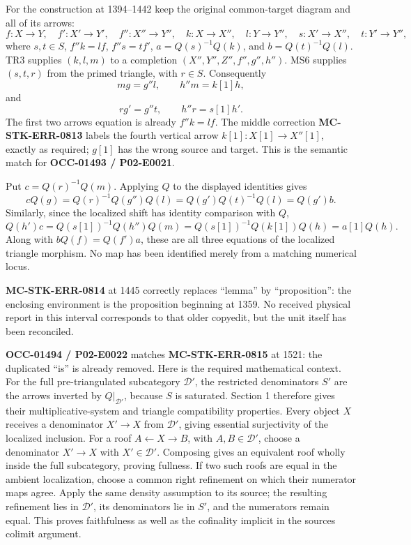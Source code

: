 For the construction at 1394–\allowbreak{}1442 keep the original common-target diagram and all of its arrows:\allowbreak{} \[
f:X\to Y,\quad f':X'\to Y',\quad f'':X''\to Y'',\quad
k:X\to X'',\quad l:Y\to Y'',\quad s:X'\to X'',\quad t:Y'\to Y'',
\] where \(s,t\in S\),\allowbreak{} \(f''k=lf\),\allowbreak{} \(f''s=tf'\),\allowbreak{} \(a=Q(s)^{-1}Q(k)\),\allowbreak{} and \(b=Q(t)^{-1}Q(l)\). TR3 supplies \((k,l,m)\) to a completion \((X'',Y'',Z'',f'',g'',h'')\). MS6 supplies \((s,t,r)\) from the primed triangle,\allowbreak{} with \(r\in S\). Consequently \[
mg=g''l,\qquad h''m=k[1]h,
\] and \[
rg'=g''t,\qquad h''r=s[1]h'.
\] The first two arrows\textquotesingle{} equation is already \(f''k=lf\). The middle correction \textbf{MC-STK-ERR-0813} labels the fourth vertical arrow \(k[1]:X[1]\to X''[1]\),\allowbreak{} exactly as required; \(g[1]\) has the wrong source and target. This is the semantic match for \textbf{OCC-01493 /\allowbreak{} P02-E0021}.

Put \(c=Q(r)^{-1}Q(m)\). Applying \(Q\) to the displayed identities gives \[
cQ(g)=Q(r)^{-1}Q(g'')Q(l)=Q(g')Q(t)^{-1}Q(l)=Q(g')b.
\] Similarly,\allowbreak{} since the localized shift has identity comparison with \(Q\),\allowbreak{} \[
Q(h')c=Q(s[1])^{-1}Q(h'')Q(m)
=Q(s[1])^{-1}Q(k[1])Q(h)=a[1]Q(h).
\] Along with \(bQ(f)=Q(f')a\),\allowbreak{} these are all three equations of the localized triangle morphism. No map has been identified merely from a matching numerical locus.

\textbf{MC-STK-ERR-0814} at 1445 correctly replaces ``lemma'' by “proposition”:\allowbreak{} the enclosing environment is the proposition beginning at 1359. No received physical report in this interval corresponds to that older copyedit,\allowbreak{} but the unit itself has been reconciled.

\textbf{OCC-01494 /\allowbreak{} P02-E0022} matches \textbf{MC-STK-ERR-0815} at 1521:\allowbreak{} the duplicated ``is'' is already removed. Here is the required mathematical context. For the full pre-triangulated subcategory \(\mathcal D'\),\allowbreak{} the restricted denominators \(S'\) are the arrows inverted by \(Q|_{\mathcal D'}\),\allowbreak{} because \(S\) is saturated. Section 1 therefore gives their multiplicative-system and triangle compatibility properties. Every object \(X\) receives a denominator \(X'\to X\) from \(\mathcal D'\),\allowbreak{} giving essential surjectivity of the localized inclusion. For a roof \(A\leftarrow X\to B\),\allowbreak{} with \(A,B\in\mathcal D'\),\allowbreak{} choose a denominator \(X'\to X\) with \(X'\in\mathcal D'\). Composing gives an equivalent roof wholly inside the full subcategory,\allowbreak{} proving fullness. If two such roofs are equal in the ambient localization,\allowbreak{} choose a common right refinement on which their numerator maps agree. Apply the same density assumption to its source; the resulting refinement lies in \(\mathcal D'\),\allowbreak{} its denominators lie in \(S'\),\allowbreak{} and the numerators remain equal. This proves faithfulness as well as the cofinality implicit in the source\textquotesingle s colimit argument.

